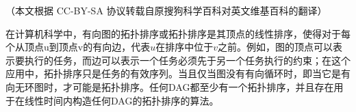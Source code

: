 
（本文根据 CC-BY-SA 协议转载自原搜狗科学百科对英文维基百科的翻译）

在计算机科学中，有向图的拓扑排序或拓扑排序是其顶点的线性排序，使得对于每个从顶点u到顶点v的有向边，代表$u$在排序中位于$v$之前。例如，图的顶点可以表示要执行的任务，而边可以表示一个任务必须先于另一个任务执行的约束；在这个应用中，拓扑排序只是任务的有效序列。当且仅当图没有有向循环时，即当它是有向无环图时，才可能是拓扑排序。任何DAG都至少有一个拓扑排序，并且存在用于在线性时间内构造任何DAG的拓扑排序的算法。